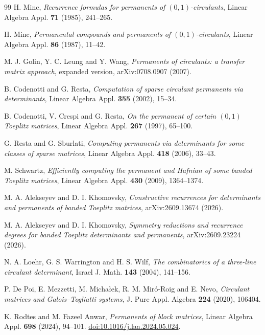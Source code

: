 \documentclass[11pt,reqno]{amsart}
\theoremstyle{remark}
\numberwithin{equation}{section}
\begin{document}
\begin{thebibliography}{99}
 H. Minc,
\emph{Recurrence formulas for permanents of \((0,1)\)-circulants},
Linear Algebra Appl. \textbf{71} (1985), 241--265.

 H. Minc,
\emph{Permanental compounds and permanents of \((0,1)\)-circulants},
Linear Algebra Appl. \textbf{86} (1987), 11--42.

 M. J. Golin, Y. C. Leung and Y. Wang,
\emph{Permanents of circulants: a transfer matrix approach},
expanded version, arXiv:0708.0907 (2007).

 B. Codenotti and G. Resta,
\emph{Computation of sparse circulant permanents via determinants},
Linear Algebra Appl. \textbf{355} (2002), 15--34.

 B. Codenotti, V. Crespi and G. Resta,
\emph{On the permanent of certain \((0,1)\) Toeplitz matrices},
Linear Algebra Appl. \textbf{267} (1997), 65--100.

 G. Resta and G. Sburlati,
\emph{Computing permanents via determinants for some classes of sparse matrices},
Linear Algebra Appl. \textbf{418} (2006), 33--43.

 M. Schwartz,
\emph{Efficiently computing the permanent and Hafnian of some banded Toeplitz matrices},
Linear Algebra Appl. \textbf{430} (2009), 1364--1374.

 M. A. Alekseyev and D. I. Khomovsky,
\emph{Constructive recurrences for determinants and permanents of banded Toeplitz matrices},
arXiv:2609.13674 (2026).

 M. A. Alekseyev and D. I. Khomovsky,
\emph{Symmetry reductions and recurrence degrees for banded Toeplitz determinants and permanents},
arXiv:2609.23224 (2026).

 N. A. Loehr, G. S. Warrington and H. S. Wilf,
\emph{The combinatorics of a three-line circulant determinant},
Israel J. Math. \textbf{143} (2004), 141--156.

 P. De Poi, E. Mezzetti, M. Micha{\l}ek,
R. M. Mir\'o-Roig and E. Nevo,
\emph{Circulant matrices and Galois--Togliatti systems},
J. Pure Appl. Algebra \textbf{224} (2020), 106404.

 K. Rodtes and M. Fazeel Anwar,
\emph{Permanents of block matrices},
Linear Algebra Appl. \textbf{698} (2024), 94--101.
\href{https://doi.org/10.1016/j.laa.2024.05.024}{doi:10.1016/j.laa.2024.05.024}.


\end{thebibliography}
\end{document}
